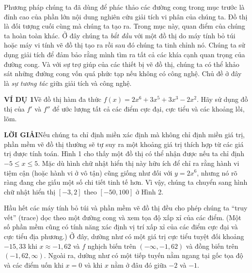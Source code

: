 \documentclass[10pt]{article}
\begin{document}
\begin{minipage}[t]{0.71\textwidth}
  \fontsize{9.3}{11.5}\selectfont
  \setlength{\parindent}{1.2em}
  \noindent
  Phương pháp chúng ta đã dùng để phác thảo các đường cong trong mục trước là đỉnh cao của phần lớn nội dung nghiên cứu giải tích vi phân của chúng ta. Đồ thị là đối tượng cuối cùng mà chúng ta tạo ra. Trong mục này, quan điểm của chúng ta hoàn toàn khác. Ở đây chúng ta \emph{bắt đầu} với một đồ thị do máy tính bỏ túi hoặc máy vi tính vẽ đồ thị tạo ra rồi sau đó chúng ta tinh chỉnh nó. Chúng ta sử dụng giải tích để đảm bảo rằng mình tìm ra tất cả các khía cạnh quan trọng của đường cong. Và với sự trợ giúp của các thiết bị vẽ đồ thị, chúng ta có thể khảo sát những đường cong vốn quá phức tạp nếu không có công nghệ. Chủ đề ở đây là \emph{sự tương tác} giữa giải tích và công nghệ.

  \vspace{0.55em}
  \noindent
  \textbf{\textsf{\color{stewartcyan}VÍ DỤ 1}}\hspace{0.8em}Vẽ đồ thị hàm đa thức $f(x) = 2x^6 + 3x^5 + 3x^3 - 2x^2$. Hãy sử dụng đồ thị của $f'$ và $f''$ để ước lượng tất cả các điểm cực đại, cực tiểu và các khoảng lồi, lõm.

  \vspace{0.5em}
  \noindent
  \textbf{\textsf{\color{stewartcyan}LỜI GIẢI}}\hspace{0.8em}Nếu chúng ta chỉ định miền xác định mà không chỉ định miền giá trị, phần mềm vẽ đồ thị thường sẽ tự suy ra một khoảng giá trị thích hợp từ các giá trị được tính toán. Hình 1 cho thấy một đồ thị có thể nhận được nếu ta chỉ định $-5 \le x \le 5$. Mặc dù hình chữ nhật hiển thị này hữu ích để chỉ ra rằng hành vi tiệm cận (hoặc hành vi ở vô tận) cũng giống như đối với $y = 2x^6$, nhưng nó rõ ràng đang che giấu một số chi tiết tinh tế hơn. Vì vậy, chúng ta chuyển sang hình chữ nhật hiển thị $[-3, 2]$ theo $[-50, 100]$ ở Hình 2.

  \indent
  Hầu hết các máy tính bỏ túi và phần mềm vẽ đồ thị đều cho phép chúng ta “truy vết” (trace) dọc theo một đường cong và xem tọa độ xấp xỉ của các điểm. (Một số phần mềm cũng có tính năng xác định vị trí xấp xỉ của các điểm cực đại và cực tiểu địa phương.) Ở đây, dường như có một giá trị cực tiểu tuyệt đối khoảng $-15{,}33$ khi $x \approx -1{,}62$ và $f$ nghịch biến trên $(-\infty, -1{,}62)$ và đồng biến trên $(-1{,}62, \infty)$. Ngoài ra, dường như có một tiếp tuyến nằm ngang tại gốc tọa độ và các điểm uốn khi $x = 0$ và khi $x$ nằm ở đâu đó giữa $-2$ và $-1$.


\end{minipage}
\end{document}
